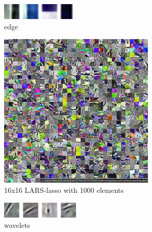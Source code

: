 \begin{figure}
\centering
\includegraphics[width = 0.33\textwidth]{images/edges.png}
\caption{edge}
\label{fig:edge}
\end{figure}

\begin{figure}
\centering
\includegraphics[width = 0.66\textwidth]{images/16_1000_1000_10_lasso.png}
\caption{16x16 LARS-lasso with 1000 elements}
\label{fig:16_1000_lasso}
\end{figure}

\begin{figure}
\centering
\includegraphics[width = 0.33\textwidth]{images/wavelet.png}
\caption{wavelets}
\label{fig:wavelets}
\end{figure}






